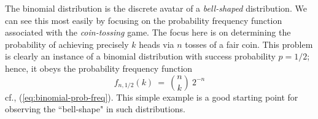 
\bigskip

 
The binomial distribution is the discrete avatar of a {\em bell-shaped} distribution.  We can see this most easily by focusing on the probability frequency function associated with the {\em coin-tossing} game.  The focus here is on determining the probability of achieving precisely $k$ {\sc head}s via $n$ tosses of a fair coin.  This problem is clearly an instance of a binomial distribution with success probability $p = 1/2$; hence, it obeys the probability frequency function 
\[ f_{n,1/2}(k) \ = \  {n \choose k} \ 2^{-n} \] 
cf., (\ref{eq:binomial-prob-freq}).  This simple example is a good starting point for observing the ``bell-shape" in such distributions.

